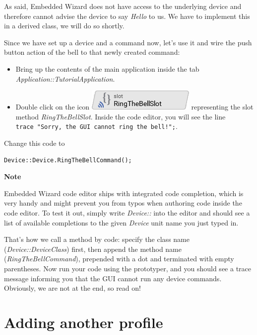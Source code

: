 \documentclass[
  a4paper,
,tablecaptionabove
]{scrbook}
\renewenvironment{quote}{\begin{customblockquote}\list{}{\rightmargin=0em\leftmargin=0em}%
\item\relax\color{blockquote-text}\ignorespaces}{\unskip\unskip\endlist\end{customblockquote}}
\begin{document}
As said, Embedded Wizard does not have access to the underlying device
and therefore cannot advise the device to say \emph{Hello} to us. We
have to implement this in a derived class, we will do so shortly.

Since we have set up a device and a command now, let's use it and wire
the push button action of the bell to that newly created command:

\begin{itemize}
\item
  Bring up the contents of the main application inside the tab
  \emph{Application::TutorialApplication}.
\item
  Double click on the icon
  \includegraphics{./../asciidoc/modules/ROOT/assets/images/icons/RingTheBellSlotIcon.png}
  representing the slot method \emph{RingTheBellSlot}. Inside the code
  editor, you will see the line
  \texttt{trace\ "Sorry,\ the\ GUI\ cannot\ ring\ the\ bell!";}.
\end{itemize}

Change this code to

\begin{verbatim}
Device::Device.RingTheBellCommand();
\end{verbatim}

\begin{quote}
\textbf{Note}

Embedded Wizard code editor ships with integrated code completion, which
is very handy and might prevent you from typos when authoring code
inside the code editor. To test it out, simply write \emph{Device::}
into the editor and should see a list of available completions to the
given \emph{Device} unit name you just typed in.
\end{quote}

That's how we call a method by code: specify the class name
(\emph{Device::DeviceClass}) first, then append the method name
(\emph{RingTheBellCommand}), prepended with a dot and terminated with
empty parentheses. Now run your code using the prototyper, and you
should see a trace message informing you that the GUI cannot run any
device commands. Obviously, we are not at the end, so read on!

\hypertarget{_adding_another_profile}{%
\section{Adding another profile}\label{_adding_another_profile}}
\end{document}
